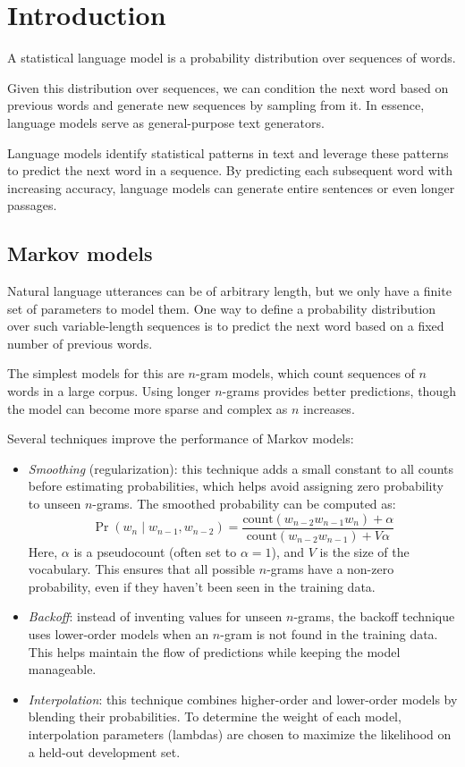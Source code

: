 \section{Introduction}

\begin{definition}
    A statistical language model is a probability distribution over sequences of words.
\end{definition}
\noindent Given this distribution over sequences, we can condition the next word based on previous words and generate new sequences by sampling from it. 
In essence, language models serve as general-purpose text generators.

Language models identify statistical patterns in text and leverage these patterns to predict the next word in a sequence. 
By predicting each subsequent word with increasing accuracy, language models can generate entire sentences or even longer passages.

\subsection{Markov models}
Natural language utterances can be of arbitrary length, but we only have a finite set of parameters to model them. 
One way to define a probability distribution over such variable-length sequences is to predict the next word based on a fixed number of previous words.

The simplest models for this are $n$-gram models, which count sequences of $n$ words in a large corpus. 
Using longer $n$-grams provides better predictions, though the model can become more sparse and complex as $n$ increases.

\noindent Several techniques improve the performance of Markov models:
\begin{itemize}
    \item \textit{Smoothing} (regularization): this technique adds a small constant to all counts before estimating probabilities, which helps avoid assigning zero probability to unseen $n$-grams. 
        The smoothed probability can be computed as:
        \[\Pr(w_n\mid w_{n-1},w_{n-2})=\dfrac{\text{count}(w_{n-2}w_{n-1}w_n)+\alpha}{\text{count}(w_{n-2}w_{n-1})+V\alpha}\]
        Here, $\alpha$ is a pseudocount (often set to $\alpha = 1$), and $V$ is the size of the vocabulary. 
        This ensures that all possible $n$-grams have a non-zero probability, even if they haven't been seen in the training data.
    \item \textit{Backoff}: instead of inventing values for unseen $n$-grams, the backoff technique uses lower-order models when an $n$-gram is not found in the training data. 
        This helps maintain the flow of predictions while keeping the model manageable.
    \item \textit{Interpolation}: this technique combines higher-order and lower-order models by blending their probabilities. 
        To determine the weight of each model, interpolation parameters (lambdas) are chosen to maximize the likelihood on a held-out development set.
\end{itemize}

